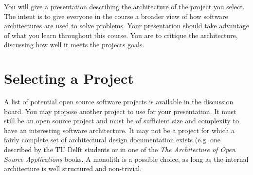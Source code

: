 \documentclass{csse4400}
\begin{document}
You will give a presentation describing the architecture of the project you select.
The intent is to give everyone in the course a broader view of how software architectures are used to solve problems.
Your presentation should take advantage of what you learn throughout this course.
You are to critique the architecture, discussing how well it meets the projects goals.


\section{Selecting a Project}
A list of potential open source software projects is available in the discussion board.
You may propose another project to use for your presentation.
It must still be an open source project and must be of sufficient size and complexity to have an interesting software architecture.
It may not be a project for which a fairly complete set of architectural design documentation exists
(e.g. one described by the TU Delft students or in one of the \textit{The Architecture of Open Source Applications} books.
A monolith is a possible choice, as long as the internal architecture is well structured and non-trivial.

%
\end{document}
